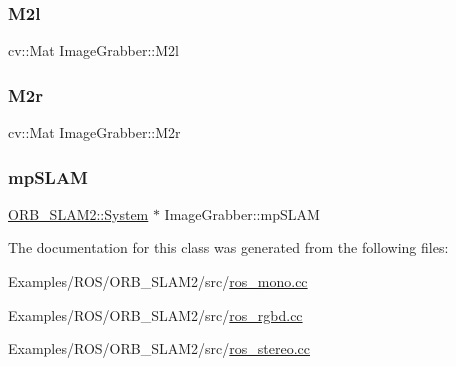 \mbox{\label{class_image_grabber_ac85158e1dfb61d91c16271649d9a0354}} 
\subsubsection{\texorpdfstring{M2l}{M2l}}
{\footnotesize\ttfamily cv\+::\+Mat Image\+Grabber\+::\+M2l}

\mbox{\label{class_image_grabber_aaf139de883a63055e03d4c82e953bb88}} 
\subsubsection{\texorpdfstring{M2r}{M2r}}
{\footnotesize\ttfamily cv\+::\+Mat Image\+Grabber\+::\+M2r}

\mbox{\label{class_image_grabber_a09543ab679feffd1969ad9bca851652f}} 
\subsubsection{\texorpdfstring{mp\+S\+L\+AM}{mpSLAM}}
{\footnotesize\ttfamily \mbox{\hyperlink{class_o_r_b___s_l_a_m2_1_1_system}{O\+R\+B\+\_\+\+S\+L\+A\+M2\+::\+System}} $\ast$ Image\+Grabber\+::mp\+S\+L\+AM}



The documentation for this class was generated from the following files\+:\begin{DoxyCompactItemize}
\item 
Examples/\+R\+O\+S/\+O\+R\+B\+\_\+\+S\+L\+A\+M2/src/\mbox{\hyperlink{ros__mono_8cc}{ros\+\_\+mono.\+cc}}\item 
Examples/\+R\+O\+S/\+O\+R\+B\+\_\+\+S\+L\+A\+M2/src/\mbox{\hyperlink{ros__rgbd_8cc}{ros\+\_\+rgbd.\+cc}}\item 
Examples/\+R\+O\+S/\+O\+R\+B\+\_\+\+S\+L\+A\+M2/src/\mbox{\hyperlink{ros__stereo_8cc}{ros\+\_\+stereo.\+cc}}\end{DoxyCompactItemize}
